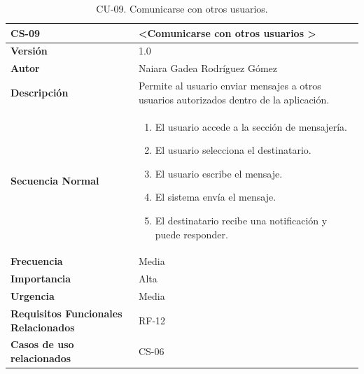 \begin{table}[htbp] %
\centering
\begin{tabular}{ |m{3cm}|m{11cm}|  } 
\hline
\cellcolor[HTML]{B9E3F0}\centering\textbf{CS-09} & \cellcolor[HTML]{B9E3F0}\textbf{\textless Comunicarse con otros usuarios \textgreater}\\

\hline
\cellcolor[HTML]{EFEFEF}\textbf{Versión}             & 1.0  \\
\hline
\cellcolor[HTML]{EFEFEF}\textbf{Autor}                & Naiara Gadea Rodríguez Gómez\\
\hline
\cellcolor[HTML]{EFEFEF}\textbf{Descripción}                & { Permite al usuario enviar mensajes a otros usuarios autorizados dentro de la aplicación. }\\
\hline
\cellcolor[HTML]{EFEFEF}\textbf{Secuencia \newline Normal}                &                 
        \begin{enumerate}
            \item El usuario accede a la sección de mensajería.
            \item El usuario selecciona el destinatario.
            \item El usuario escribe el mensaje.
            \item El sistema envía el mensaje.
            \item El destinatario recibe una notificación y puede responder.
        \end{enumerate}\\
\hline
\cellcolor[HTML]{EFEFEF}\textbf{Frecuencia}                & Media\\
\hline
\cellcolor[HTML]{EFEFEF}\textbf{Importancia}                & Alta\\
\hline
\cellcolor[HTML]{EFEFEF}\textbf{Urgencia}                & Media\\
\hline
\cellcolor[HTML]{EFEFEF}\textbf{Requisitos Funcionales Relacionados}                & { RF-12 }\\
\hline
\cellcolor[HTML]{EFEFEF}\textbf{Casos de uso relacionados}                & { CS-06 }\\
\hline
\end{tabular}
\caption{CU-09. Comunicarse con otros usuarios.}
\end{table}


